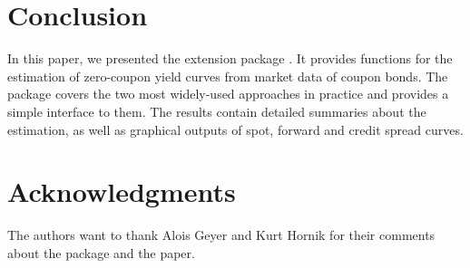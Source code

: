 \clearpage
\section{Conclusion}
\label{sec:conclusion}

In this paper, we presented the  extension package . It provides functions for the estimation of zero-coupon yield curves from market data of coupon bonds. The package covers the two most widely-used approaches in practice and provides a simple interface to them. The results contain detailed summaries about the estimation, as well as graphical outputs of spot, forward and credit spread curves.


\section*{Acknowledgments}

The authors want to thank Alois Geyer and Kurt Hornik for their comments about the package and the paper.


